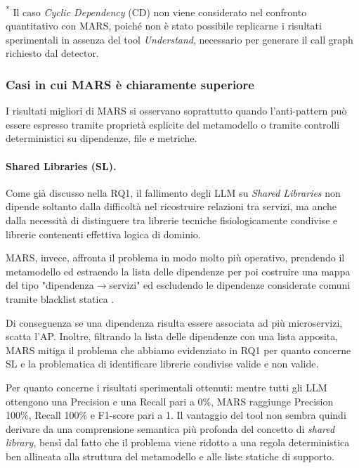 \begin{table}[htbp]
\vspace{1mm}
\begin{minipage}{0.98\textwidth}
\footnotesize
\textsuperscript{*} Il caso \textit{Cyclic Dependency} (CD) non viene considerato nel confronto quantitativo con MARS, poiché non è stato possibile replicarne i risultati sperimentali in assenza del tool \textit{Understand}, necessario per generare il call graph richiesto dal detector.
\end{minipage}

\end{table}




\subsubsection*{Casi in cui MARS è chiaramente superiore}

I risultati migliori di MARS si osservano soprattutto quando l’anti-pattern può essere espresso tramite proprietà esplicite del metamodello o tramite controlli deterministici su dipendenze, file e metriche.

\paragraph{Shared Libraries (SL).}
Come già discusso nella RQ1, il fallimento degli LLM su \textit{Shared Libraries} non dipende soltanto dalla difficoltà nel ricostruire relazioni tra servizi, ma anche dalla necessità di distinguere tra librerie tecniche fisiologicamente condivise e librerie contenenti effettiva logica di dominio. 

MARS, invece, affronta il problema in modo molto più operativo, prendendo il metamodello ed estraendo la lista delle dipendenze per poi costruire una mappa del tipo "dipendenza$\rightarrow$servizi" ed escludendo le dipendenze considerate comuni tramite blacklist statica \cite{MARS, madern2024_mars}. 

Di conseguenza se una dipendenza risulta essere associata ad più microservizi, scatta l'AP. Inoltre, filtrando la lista delle dipendenze con una lista apposita, MARS mitiga il problema che abbiamo evidenziato in RQ1 per quanto concerne SL e la problematica di identificare librerie condivise valide e non valide.


Per quanto concerne i risultati sperimentali ottenuti: mentre tutti gli LLM ottengono una Precision e una Recall pari a 0\%, MARS raggiunge Precision 100\%, Recall 100\% e F1-score pari a 1. Il vantaggio del tool non sembra quindi derivare da una comprensione semantica più profonda del concetto di \textit{shared library}, bensì dal fatto che il problema viene ridotto a una regola deterministica ben allineata alla struttura del metamodello e alle liste statiche di supporto.


